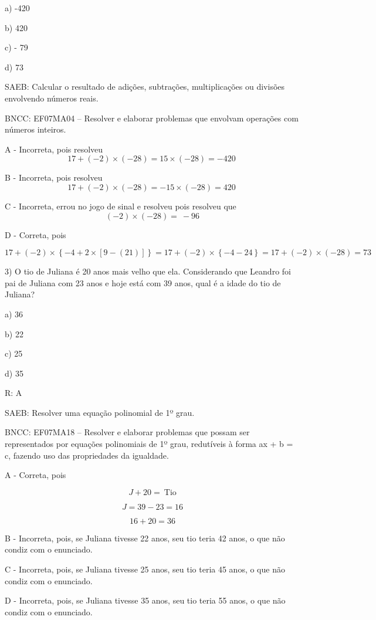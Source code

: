 a) -420

b) 420

c) - 79

d) 73

SAEB: Calcular o resultado de adições, subtrações, multiplicações ou
divisões envolvendo números reais.

BNCC: EF07MA04 -- Resolver e elaborar problemas que envolvam operações
com números inteiros.

A - Incorreta, pois resolveu
\[17 + ( - 2) \times \left( - 28 \right) = 15 \times ( - 28) = - 420\ \]

B - Incorreta, pois resolveu
\[17 + ( - 2) \times \left( - 28 \right) = - 15 \times ( - 28) = 420\ \]

C - Incorreta, errou no jogo de sinal e resolveu pois resolveu que
\[( - 2) \times \left( - 28 \right) = \  - 96\]

D - Correta, pois

\[17 + ( - 2) \times \left\{ - 4 + 2 \times \left\lbrack 9 - \left( 21 \right) \right\rbrack \right\} = 17 + ( - 2) \times \left\{ - 4 - 24 \right\} = 17 + ( - 2) \times \left( - 28 \right) = 73\]

3) O tio de Juliana é 20 anos mais velho que ela. Considerando que
Leandro foi pai de Juliana com 23 anos e hoje está com 39 anos, qual é a
idade do tio de Juliana?

a) 36

b) 22

c) 25

d) 35

R: A

SAEB: Resolver uma equação polinomial de 1º grau.

BNCC: EF07MA18 -- Resolver e elaborar problemas que possam ser
representados por equações polinomiais de 1º grau, redutíveis à forma ax
+ b = c, fazendo uso das propriedades da igualdade.

A - Correta, pois

\[J + 20 = \ \text{Tio}\]

\[J = 39 - 23 = 16\]

\[16 + 20 = 36\]

B - Incorreta, pois, se Juliana tivesse 22 anos, seu tio teria 42 anos,
o que não condiz com o enunciado.

C - Incorreta, pois, se Juliana tivesse 25 anos, seu tio teria 45 anos,
o que não condiz com o enunciado.

D - Incorreta, pois, se Juliana tivesse 35 anos, seu tio teria 55 anos,
o que não condiz com o enunciado.

